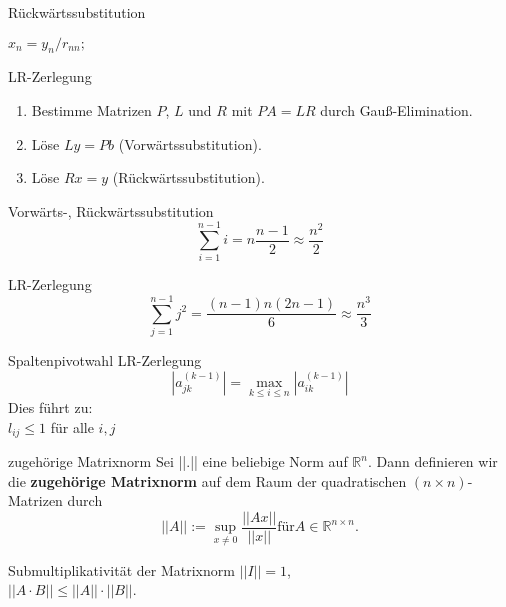 
\begin{flashcard}[Algorithmus]{Rückwärtssubstitution}
\begin{algorithm}[H]
	$x_n = y_n/r_{nn};$\\
\end{algorithm}
\end{flashcard}

\begin{flashcard}[Algorithmus]{LR-Zerlegung}
\begin{enumerate}
	\item Bestimme Matrizen $P$, $L$ und $R$ mit $PA = LR$ durch Gauß-Elimination.
	\item Löse $Ly = Pb$ (Vorwärtssubstitution).
	\item Löse $Rx = y$ (Rückwärtssubstitution).
\end{enumerate}
\end{flashcard}

\begin{flashcard}[Aufwand]{Vorwärts-, Rückwärtssubstitution}
$$\sum_{i=1}^{n-1}i = n \frac{n-1}{2} \approx \frac{n^2}{2}$$
\end{flashcard}

\begin{flashcard}[Aufwand]{LR-Zerlegung}
$$\sum_{j=1}^{n-1}j^2 = \frac{(n-1)n(2n-1)}{6} \approx \frac{n^3}{3}$$
\end{flashcard}

\begin{flashcard}{Spaltenpivotwahl LR-Zerlegung}
$$|a_{jk}^{(k-1)}| = \max_{k \leq i \leq n} |a_{ik}^{(k-1)}|$$
Dies führt zu:\\
$l_{ij} \leq 1$ für alle $i, j$
\end{flashcard}

\begin{flashcard}[Definition]{zugehörige Matrixnorm}
Sei ||.|| eine beliebige Norm auf $\mathbb{R}^n$. Dann definieren wir die \textbf{zugehörige Matrixnorm} auf dem Raum der quadratischen $(n \times n)$-Matrizen durch
$$||A|| := \sup_{x \neq 0} \frac{||Ax||}{||x||} \text{für} A \in \mathbb{R}^{n \times n} \text{.}$$
\end{flashcard}

\begin{flashcard}{Submultiplikativität der Matrixnorm}
$||I|| = 1$,\\
$||A \cdot B|| \leq ||A|| \cdot ||B||$.
\end{flashcard}

